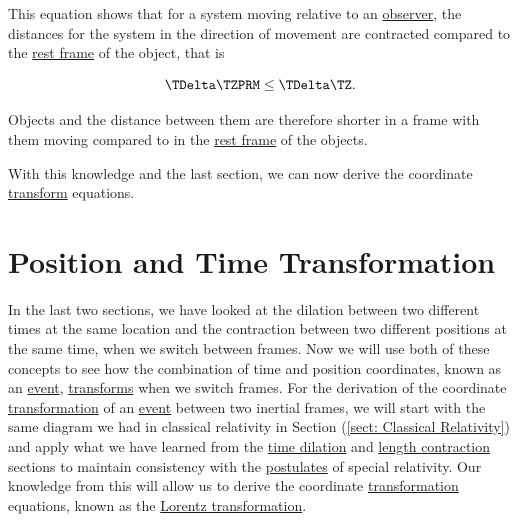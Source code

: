 This equation shows that for a system moving relative to an \hyperlink{def-observer}{observer}, the distances for the system in the direction of movement are contracted compared to the \hyperlink{def-proper-frame}{rest frame} of the object, that is

\begin{equation}
	{\TDelta   \TZPRM } \leq {\TDelta   \TZ }.
\end{equation}

Objects and the distance between them are therefore shorter in a frame with them moving compared to in the \hyperlink{def-proper-frame}{rest frame} of the objects.

With this knowledge and the last section, we can now derive the coordinate \hyperlink{def-transform}{transform} equations.

\section{Position and Time Transformation} \label{sect: Position and Time Transformation}

In the last two sections, we have looked at the dilation between two different times at the same location and the contraction between two different positions at the same time, when we switch between frames.
Now we will use both of these concepts to see how the combination of time and position coordinates, known as an \hyperlink{def-event}{event}, \hyperlink{def-transform}{transforms} when we switch frames.
For the derivation of the coordinate \hyperlink{def-transform}{transformation} of an \hyperlink{def-event}{event} between two inertial frames, we will start with the same diagram we had in classical relativity in Section (\ref{sect: Classical Relativity}) and apply what we have learned from the \hyperlink{def-time-dilation}{time dilation} and \hyperlink{def-length-contraction}{length contraction} sections to maintain consistency with the \hyperlink{def-postulates}{postulates} of special relativity.
Our knowledge from this will allow us to derive the coordinate \hyperlink{def-transform}{transformation} equations, known as the \hyperlink{def-lorentz-transform}{Lorentz transformation}.

